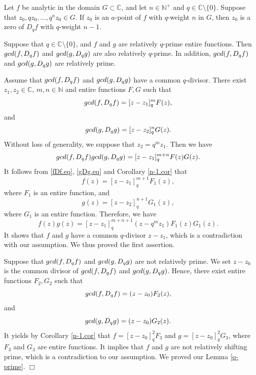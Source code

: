 \documentclass[10pt,a4paper]{amsart}
\newcommand{\C}{\mathbb{C}}
\newcommand{\N}{\mathbb{N}}
\newenvironment{proof}
{\noindent{\it Proof.}}{\hfill $\Box$\par\vspace{2.5mm}}
\begin{document}
\begin{corollary}\label{n-1.cor}
Let $f$ be analytic in the domain $G\subset\C$, and let $n\in\N^+$ and $q\in\C\setminus\{0\}$. Suppose that $z_0, qz_0,\ldots, q^nz_0\in G$.
If $z_0$ is an $a$-point of $f$ with $q$-weight $n$ in $G$, then $z_0$ is a zero of $D_q f$ with $q$-weight $n-1$.
\end{corollary}

\begin{lemma}\label{q-prime}
Suppose that $q\in\C\setminus\{0\}$, and $f$ and $g$ are relatively $q$-prime entire functions. Then ${\rm gcd}(f,D_q f)$
and ${\rm gcd}(g,D_q g)$ are also relatively $q$-prime. In addition, ${\rm gcd}(f,D_q f)$
and ${\rm gcd}(g,D_q g)$ are relatively prime.
\end{lemma}

\begin{proof}
Assume that ${\rm gcd}(f,D_q f)$ and ${\rm gcd}(g,D_q g)$ have a common $q$-divisor.
There exist $z_1,z_2\in\C$, $m,n\in\N$ and entire functions $F,G$ such that
    \begin{equation}\label{fDf.eq}
    {\rm gcd}(f,D_q f)=[z-z_1]_q^mF(z),
    \end{equation}
and
    \begin{equation}\label{gDg.eq}
    {\rm gcd}(g,D_q g)=[z-z_2]_q^nG(z).
    \end{equation}
Without loss of generality, we suppose that $z_2=q^mz_1$. Then we have
    $$
    {\rm gcd}(f,D_q f){\rm gcd}(g,D_q g)=[z-z_1]^{m+n}_qF(z)G(z).
    $$
It follows from \eqref{fDf.eq}, \eqref{gDg.eq} and Corollary \ref{n-1.cor} that
    $$
    f(z)=[z-z_1]^{m+1}_qF_1(z),
    $$
where $F_1$ is an entire function, and
    $$
    g(z)=[z-z_2]^{n+1}_qG_1(z),
    $$
where $G_1$ is an entire function. Therefore, we have
    $$
    f(z)g(z)=[z-z_1]^{m+n+1}_q(z-q^mz_1)F_1(z)G_1(z).
    $$
It shows that $f$ and $g$ have a common $q$-divisor $z-z_1$, which is a contradiction
with our assumption. We thus proved the first assertion.

Suppose that ${\rm gcd}(f,D_q f)$ and ${\rm gcd}(g,D_q g)$ are not relatively prime.
We set $z-z_0$ is the common divisor of ${\rm gcd}(f,D_q f)$ and ${\rm gcd}(g,D_q g)$. Hence,
there exist entire functions $F_2, G_2$ such that
    $$
    {\rm gcd}(f,D_q f)=(z-z_0)F_2(z),
    $$
and
    $$
    {\rm gcd}(g,D_q g)=(z-z_0)G_2(z).
    $$
It yields by Corollary \ref{n-1.cor} that $f=[z-z_0]^2_qF_3$ and $g=[z-z_0]_q^2G_3$, where $F_3$ and $G_3$ are entire functions. It implies that $f$ and $g$ are not relatively shifting prime, which
is a contradiction to our assumption. We proved our Lemma \ref{q-prime}.
\end{proof}
\end{document}
